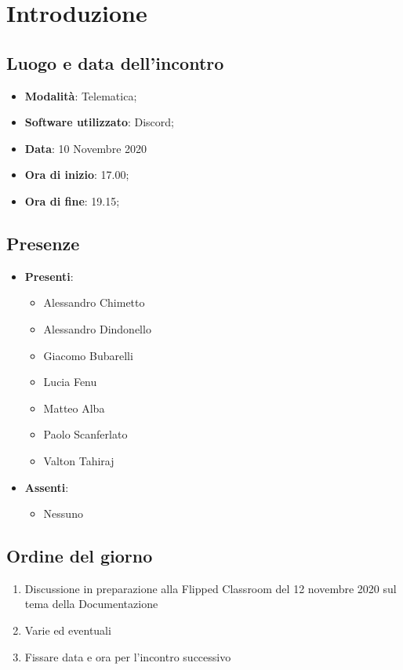 \documentclass[]{article}
\begin{document}
	
	
	
	\newpage
	
	\section{Introduzione}
\subsection{Luogo e data dell'incontro}
\begin{itemize}
	\item \textbf{Modalità}: Telematica;
	\item \textbf{Software utilizzato}: Discord;
	\item \textbf{Data}: 10 Novembre 2020
	\item \textbf{Ora di inizio}: 17.00;
	\item \textbf{Ora di fine}: 19.15;
\end{itemize}

\subsection{Presenze}
\begin{itemize}
	\item \textbf{Presenti}: 
	\begin{itemize}
		\item Alessandro Chimetto
		\item Alessandro Dindonello
		\item Giacomo Bubarelli
		\item Lucia Fenu
		\item Matteo Alba
		\item Paolo Scanferlato
		\item Valton Tahiraj
	\end{itemize}
	\item \textbf{Assenti}:
	\begin{itemize}
		\item Nessuno
	\end{itemize}
\end{itemize}


\subsection{Ordine del giorno}
\begin{enumerate}
	\item Discussione in preparazione alla Flipped Classroom del 12 novembre 2020 sul tema della Documentazione
	\item Varie ed eventuali
	\item Fissare data e ora per l'incontro successivo
\end{enumerate}
\end{document}
